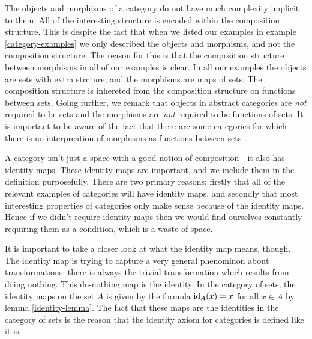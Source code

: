 \begin{rem}The objects and morphisms of a category do not have much complexity implicit to them.  All of the interesting structure is encoded within the composition structure. This is despite the fact that when we listed our examples in example \ref{category-examples} we only described the objects and morphisms, and not the composition structure. The reason for this is that the composition structure between morphisms in all of our examples is clear. In all our examples the objects are sets with extra strcture, and the morphisms are maps of sets. The composition structure is inhereted from the composition structure on functions between sets. Going further, we remark that objects in abstract categories are {\em not} required to be sets and the morphisms are {\em not} required to be functions of sets. It is important to be aware of the fact that there are some categories for which there is no interpreation of morphisms as functions between sets \cite{freyd1970homotopy}.
\end{rem}

\begin{rem} A category isn't just a space with a good notion of composition - it also has identity maps. These identity maps are important, and we include them in the definition purposefully. There are two primary reasons: firstly that all of the relevant examples of categories will have identity maps, and secondly that most interesting properties of categories only make sense because of the identity maps. Hence if we didn't require identity maps then we would find ourselves constantly requiring them as a condition, which is a waste of space.

It is important to take a closer look at what the identity map means, though. The identity map is trying to capture a very general phenominon about transformations: there is always the trivial transformation which results from doing nothing. This do-nothing map is the identity. In the category of sets, the identity maps on the set $A$ is given by the formula $\operatorname{id}_A(x)=x$ for all $x\in A$ by lemma \ref{identity-lemma}. The fact that these maps are the identities in the category of sets is the reason that the identity axiom for categories is defined like it is.
\end{rem}

